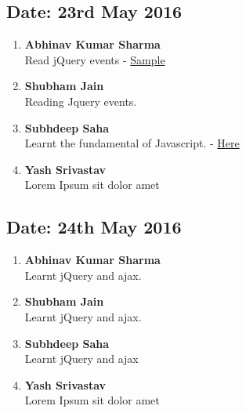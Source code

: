 \documentclass[11pt,a4paper]{article}
\begin{document}
    \subsection{Date: 23rd May 2016}
      \begin{enumerate}
        \item
          \textbf{Abhinav Kumar Sharma\\ }
           Read jQuery events - \href{https://gist.github.com/jmoriarty221B/3055cc363fe67bdd0ad2238cb4257781}{Sample}

        \item
          \textbf{Shubham Jain}\\ 
           Reading Jquery events.
        \item
          \textbf{Subhdeep Saha}\\ 
          Learnt the fundamental of Javascript. - \href{https://gist.github.com/yashsriv/211595704a68cac8d795016bcb1e49be}{Here}
        \item
          \textbf{Yash Srivastav}\\ 
           Lorem Ipsum sit dolor amet
      \end{enumerate}
    \subsection{Date: 24th May 2016}
      \begin{enumerate}
        \item
          \textbf{Abhinav Kumar Sharma\\ }
           Learnt jQuery and ajax.
        \item
          \textbf{Shubham Jain}\\ 
           Learnt jQuery and ajax.
        \item
          \textbf{Subhdeep Saha}\\ 
           Learnt jQuery and ajax
        \item
          \textbf{Yash Srivastav}\\ 
           Lorem Ipsum sit dolor amet
      \end{enumerate}
\end{document}
